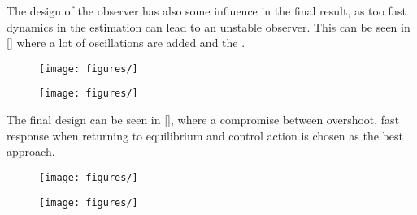 The design of the observer has also some influence in the final result, as too fast dynamics in the estimation can lead to an unstable observer. This can be seen in \autoref{} where a lot of oscillations are added and the  .
%
\begin{minipage}{\linewidth}
    \begin{minipage}{0.5\linewidth}
        \begin{figure}[H]
            \texttt{[image: figures/]}
            \centering			
            \label{attitudeControllerObserver1}
        \end{figure}
    \end{minipage}
    \hspace{0.03\linewidth}
    \begin{minipage}{0.5\linewidth}
        \begin{figure}[H]
            \texttt{[image: figures/]}
            \centering
            \label{attitudeControllerObserver2}
        \end{figure}
    \end{minipage}
\end{minipage}

The final design can be seen in \autoref{}, where a compromise between overshoot, fast response when returning to equilibrium and control action is chosen as the best approach.
        
\begin{minipage}{\linewidth}
    \begin{minipage}{0.5\linewidth}
        \begin{figure}[H]
            \texttt{[image: figures/]}
            \centering			
            \label{attitudeControllerFinal}
        \end{figure}
    \end{minipage}
    \hspace{0.03\linewidth}
    \begin{minipage}{0.5\linewidth}
        \begin{figure}[H]
            \texttt{[image: figures/]}
            \centering
            \label{attitudeControllerObserver}
        \end{figure}
    \end{minipage}
\end{minipage}

